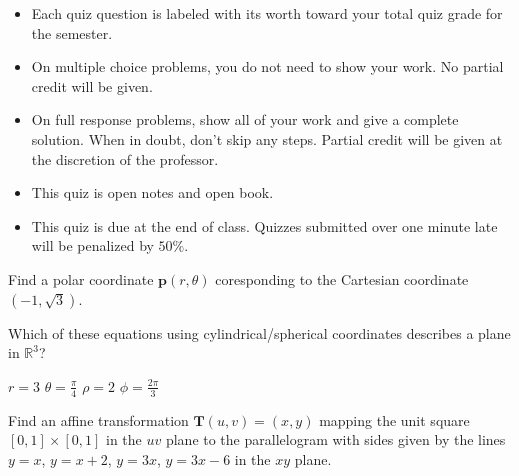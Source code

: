 \documentclass[12pt]{exam}
\newcommand{\vect}[1]{\ensuremath{\mathbf{#1}}}
\newcommand{\<}{(}
\renewcommand{\>}{)}
\begin{document}
\begin{center}
\end{center}
\vspace{0.1in}

\vspace{12pt}

\begin{itemize}
  \item Each quiz question is labeled with its worth toward your total quiz
        grade for the semester.
  \item On multiple choice problems, you do not need to show your work. No
        partial credit will be given.
  \item On full response problems, show all of your work and give a
        complete solution. When in doubt, don't skip any steps. Partial
        credit will be given at the discretion of the professor.
  \item This quiz is open notes and open book.
  \item This quiz is due at the end of class. Quizzes submitted over one minute
        late will be penalized by \(50\%\).
\end{itemize}

\newpage

\begin{questions}

\question[10]
Find a polar coordinate \(\vect p(r,\theta)\) coresponding to
the Cartesian coordinate \((-1,\sqrt 3)\).

\vfill
\vfill

\question[10]
Which of these equations using cylindrical/spherical coordinates
describes a plane in \(\mathbb R^3\)?

\begin{checkboxes}
\choice \(r=3\)
\choice \(\theta=\frac{\pi}{4}\)
\choice \(\rho=2\)
\choice \(\phi=\frac{2\pi}{3}\)
\end{checkboxes}

\vfill

\newpage

\question[10]
Find an affine transformation \(\vect T(u,v)=(x,y)\)
mapping the unit square \([0,1]\times[0,1]\)
in the \(uv\) plane to the parallelogram with sides given by the lines
\(y=x\), \(y=x+2\), \(y=3x\), \(y=3x-6\) in the \(xy\) plane.

\end{questions}
\end{document}
